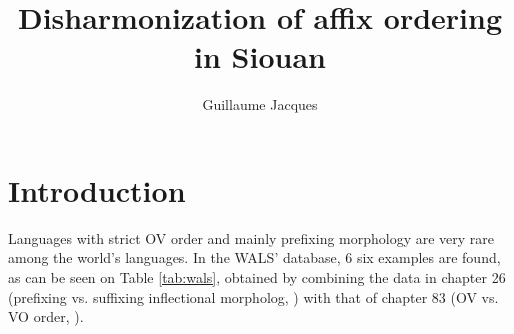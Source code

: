 \documentclass[oldfontcommands,twoside,a4paper,12pt]{article}
\begin{document}
  \title{Disharmonization of affix ordering in Siouan}
\author{Guillaume Jacques}
\maketitle




 

  \section{Introduction}
 
Languages with strict OV  order and mainly prefixing morphology are very rare among the world's languages. In the WALS' database, 6 six examples are found, as can be seen on Table \ref{tab:wals}, obtained by combining the data in chapter 26 (prefixing vs. suffixing inflectional morpholog, \citealt{dryer11chapter26}) with that of chapter  83 (OV vs. VO order, \citealt{dryer11ov}).

\begin{table}[H]

\caption{Correlation between OV order and prefixing vs. suffixing inflectional morphology (data from WALS); each row in the table adds up to 100\%} \label{tab:wals}
\end{table}
\end{document}
